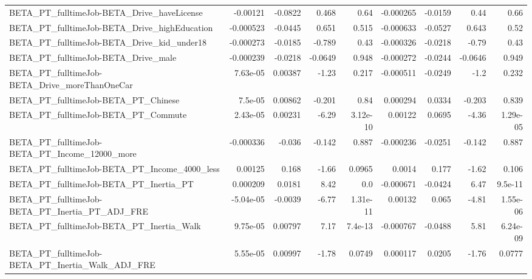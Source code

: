 \begin{tabular}{lrrrrrrrr}
BETA\_PT\_fulltimeJob-BETA\_Drive\_haveLicense         &    -0.00121 &      -0.0822 &    0.468 &     0.64 &  -0.000265 &     -0.0159 &         0.44 &          0.66 \\
BETA\_PT\_fulltimeJob-BETA\_Drive\_highEducation       &   -0.000523 &      -0.0445 &    0.651 &    0.515 &  -0.000633 &     -0.0527 &        0.643 &          0.52 \\
BETA\_PT\_fulltimeJob-BETA\_Drive\_kid\_under18         &   -0.000273 &      -0.0185 &   -0.789 &     0.43 &  -0.000326 &     -0.0218 &        -0.79 &          0.43 \\
BETA\_PT\_fulltimeJob-BETA\_Drive\_male                &   -0.000239 &      -0.0218 &  -0.0649 &    0.948 &  -0.000272 &     -0.0244 &      -0.0646 &         0.949 \\
BETA\_PT\_fulltimeJob-BETA\_Drive\_moreThanOneCar      &    7.63e-05 &      0.00387 &    -1.23 &    0.217 &  -0.000511 &     -0.0249 &         -1.2 &         0.232 \\
BETA\_PT\_fulltimeJob-BETA\_PT\_Chinese                &     7.5e-05 &      0.00862 &   -0.201 &     0.84 &   0.000294 &      0.0334 &       -0.203 &         0.839 \\
BETA\_PT\_fulltimeJob-BETA\_PT\_Commute                &    2.43e-05 &      0.00231 &    -6.29 & 3.12e-10 &    0.00122 &      0.0695 &        -4.36 &      1.29e-05 \\
BETA\_PT\_fulltimeJob-BETA\_PT\_Income\_12000\_more      &   -0.000336 &       -0.036 &   -0.142 &    0.887 &  -0.000236 &     -0.0251 &       -0.142 &         0.887 \\
BETA\_PT\_fulltimeJob-BETA\_PT\_Income\_4000\_less       &     0.00125 &        0.168 &    -1.66 &   0.0965 &     0.0014 &       0.177 &        -1.62 &         0.106 \\
BETA\_PT\_fulltimeJob-BETA\_PT\_Inertia\_PT             &    0.000209 &       0.0181 &     8.42 &      0.0 &  -0.000671 &     -0.0424 &         6.47 &       9.5e-11 \\
BETA\_PT\_fulltimeJob-BETA\_PT\_Inertia\_PT\_ADJ\_FRE     &   -5.04e-05 &      -0.0039 &    -6.77 & 1.31e-11 &    0.00132 &       0.065 &        -4.81 &      1.55e-06 \\
BETA\_PT\_fulltimeJob-BETA\_PT\_Inertia\_Walk           &    9.75e-05 &      0.00797 &     7.17 &  7.4e-13 &  -0.000767 &     -0.0488 &         5.81 &      6.24e-09 \\
BETA\_PT\_fulltimeJob-BETA\_PT\_Inertia\_Walk\_ADJ\_FRE   &    5.55e-05 &      0.00997 &    -1.78 &   0.0749 &   0.000117 &      0.0205 &        -1.76 &        0.0777 \\

\end{tabular}
